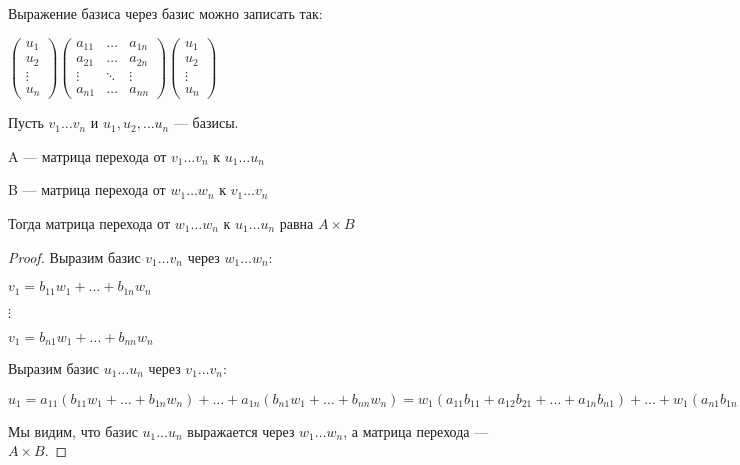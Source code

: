 \begin{remark}
    Выражение базиса через базис можно записать так:

    $\left(
    \begin{array}{c}
        u_{1} \\
        u_{2} \\
        \vdots \\
        u_{n} 
    \end{array}
    \right) \left(
        \begin{array}{ccc}
            a_{11} & \ldots & a_{1n}\\
            a_{21} & \ldots & a_{2n}\\
            \vdots & \ddots & \vdots\\
            a_{n1} &\ldots & a_{nn}
        \end{array}
        \right) \left(
            \begin{array}{c}
                u_{1}\\
                u_{2}\\
                \vdots\\
                u_{n}
            \end{array}
            \right)$    
\end{remark}

\begin{theorem}
    Пусть $v_1 \ldots v_n$ и $u_1, u_2, \ldots u_n$ --- базисы.

    A --- матрица перехода от $v_1 \ldots v_n$ к $u_1 \ldots u_n$
    
    B --- матрица перехода от $w_1 \ldots w_n$ к $v_1 \ldots v_n$

    Тогда матрица перехода от $w_1 \ldots w_n$ к $u_1 \ldots u_n$ равна $A \times B$
\end{theorem}

\begin{proof} Выразим базис $v_1 \ldots v_n$ через $w_1 \ldots w_n$:
    
    $v_1 = b_{11}w_1 + \ldots + b_{1n}w_n$
    
    $\vdots$

    $v_1 = b_{n1}w_1 + \ldots + b_{nn}w_n$
   
    Выразим базис $u_1 \ldots u_n$ через $v_1 \ldots v_n$:

    $u_1 = a_{11}(b_{11}w_1 + \ldots + b_{1n}w_n) + \ldots + a_{1n}(b_{n1}w_1 + \ldots + b_{nn}w_n) = w_1(a_{11}b_{11} + a_{12}b_{21} + \ldots + a_{1n}b_{n1}) + \ldots + w_1(a_{n1}b_{1n} + a_{n2}b_{2n} + \ldots + a_{nn}b_{nn})$

    Мы видим, что базис $u_1 \ldots u_n$ выражается через $w_1 \ldots w_n$, а матрица перехода --- $A \times B$.
\end{proof}

